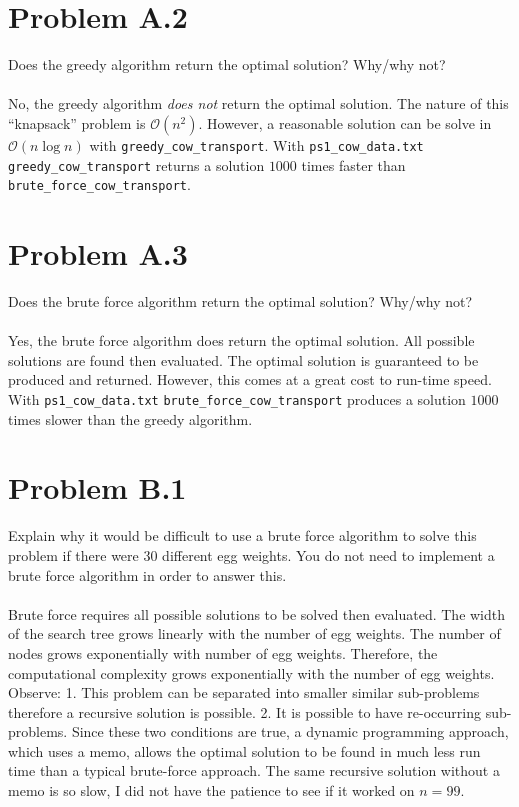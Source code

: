 \documentclass[letterpaper,11pt]{article}
\begin{document}
\section*{Problem A.2}
Does the greedy algorithm return the optimal solution? Why/why not? \\
\\
No, the greedy algorithm \emph{does not} return the optimal solution.
The nature of this ``knapsack'' problem is $\mathcal{O}(n^{2})$.
However, a reasonable solution can be solve in $\mathcal{O}(n\log n)$ with \texttt{greedy\_cow\_transport}.
With \texttt{ps1\_cow\_data.txt} \texttt{greedy\_cow\_transport} returns a solution $1000$ times faster than
\texttt{brute\_force\_cow\_transport}.

\section*{Problem A.3}
Does the brute force algorithm return the optimal solution? Why/why not? \\
\\
Yes, the brute force algorithm does return the optimal solution.
All possible solutions are found then evaluated. 
The optimal solution is guaranteed to be produced and returned.
However, this comes at a great cost to run-time speed.
With \texttt{ps1\_cow\_data.txt} \texttt{brute\_force\_cow\_transport} produces a solution $1000$ times slower
than the greedy algorithm. 

\section*{Problem B.1}
Explain why it would be difficult to use a brute force algorithm to solve this problem if there were $30$ different egg weights.
You do not need to implement a brute force algorithm in order to answer this. \\
\\
Brute force requires all possible solutions to be solved then evaluated.
The width of the search tree grows linearly with the number of egg weights.
The number of nodes grows exponentially with number of egg weights.
Therefore, the computational complexity grows exponentially with the number of egg weights.
Observe:
1. This problem can be separated into smaller similar sub-problems therefore a recursive solution is possible.
2. It is possible to have re-occurring sub-problems. 
Since these two conditions are true, a dynamic programming approach, which uses a memo,
allows the optimal solution to be found in much less run time than a typical brute-force approach.
The same recursive solution without a memo is so slow, I did not have the patience to see if it worked on $n = 99$.
\end{document}
